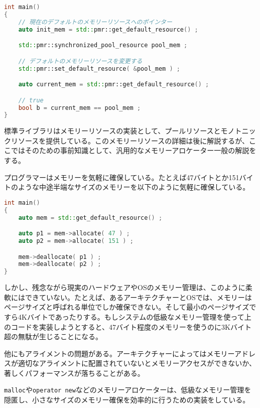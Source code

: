 \begin{lstlisting}[language=C++]
int main()
{
    // 現在のデフォルトのメモリーリソースへのポインター
    auto init_mem = std::pmr::get_default_resource() ;

    std::pmr::synchronized_pool_resource pool_mem ;

    // デフォルトのメモリーリソースを変更する
    std::pmr::set_default_resource( &pool_mem ) ;

    auto current_mem = std::pmr::get_default_resource() ;

    // true
    bool b = current_mem == pool_mem ;
}
\end{lstlisting}

%

標準ライブラリはメモリーリソースの実装として、プールリソースとモノトニックリソースを提供している。このメモリーリソースの詳細は後に解説するが、ここではそのための事前知識として、汎用的なメモリーアロケーター一般の解説をする。

プログラマーはメモリーを気軽に確保している。たとえば47バイトとか151バイトのような中途半端なサイズのメモリーを以下のように気軽に確保している。

\begin{lstlisting}[language=C++]
int main()
{
    auto mem = std::get_default_resource() ;

    auto p1 = mem->allocate( 47 ) ;
    auto p2 = mem->allocate( 151 ) ;

    mem->deallocate( p1 ) ;
    mem->deallocate( p2 ) ;
}
\end{lstlisting}

しかし、残念ながら現実のハードウェアやOSのメモリー管理は、このように柔軟にはできていない。たとえば、あるアーキテクチャーとOSでは、メモリーはページサイズと呼ばれる単位でしか確保できない。そして最小のページサイズですら4Kバイトであったりする。もしシステムの低級なメモリー管理を使って上のコードを実装しようとすると、47バイト程度のメモリーを使うのに3Kバイト超の無駄が生じることになる。

他にもアライメントの問題がある。アーキテクチャーによってはメモリーアドレスが適切なアライメントに配置されていないとメモリーアクセスができないか、著しくパフォーマンスが落ちることがある。

\lstinline!malloc!や\lstinline!operator new!などのメモリーアロケーターは、低級なメモリー管理を隠匿し、小さなサイズのメモリー確保を効率的に行うための実装をしている。


